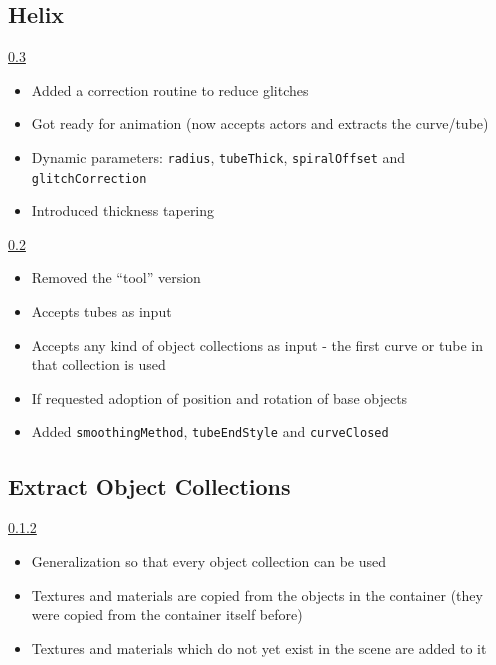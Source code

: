 \documentclass[12pt,a4paper]{scrartcl}
\begin{document}
\subsection{Helix}
\underline{0.3}
\begin{itemize}
	\item Added a correction routine to reduce glitches
	\item Got ready for animation (now accepts actors and extracts the
		curve/tube)
	\item Dynamic parameters: \texttt{radius}, \texttt{tubeThick},
		\texttt{spiralOffset} and \texttt{glitchCorrection}
	\item Introduced thickness tapering
\end{itemize}
\underline{0.2}
\begin{itemize}
	\item Removed the ``tool'' version
	\item Accepts tubes as input
	\item Accepts any kind of object collections as input - the first
		curve or tube in that collection is used
	\item If requested adoption of position and rotation of base objects
	\item Added \texttt{smoothingMethod}, \texttt{tubeEndStyle} and
		\texttt{curveClosed}
\end{itemize}

\subsection{Extract Object Collections}
\underline{0.1.2}
\begin{itemize}
	\item Generalization so that every object collection can be used
	\item Textures and materials are copied from the objects in the
		container (they were copied from the container itself before)
	\item Textures and materials which do not yet exist in the scene
		are added to it
\end{itemize}
\end{document}
